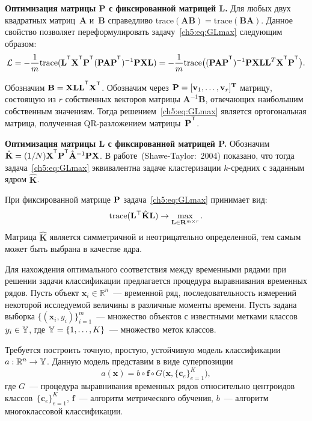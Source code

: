 \documentclass[11pt, a5paper]{dissert}
\begin{document}
\textbf{Оптимизация матрицы P с фиксированной матрицей L.}
Для любых двух квадратных матриц~$\mathbf{A}$ и~$\mathbf{B}$ справедливо $\text{trace}(\mathbf{AB}) = \text{trace}(\mathbf{BA})$.
Данное свойство позволяет переформулировать задачу~\eqref{ch5:eq:GLmax} следующим образом:
\[
	\cL = -\frac{1}{m} \text{trace} (\mathbf{L}^{\T} \bX^{\T} \bP^{\T} (\bP \mathbf{A} \bP^{\T})^{-1} \bP \bX \mathbf{L}) = -\frac{1}{m} \text{trace} \bigl((\bP \mathbf{A} \bP^{\T})^{-1} \bP \bX \mathbf{LL}^{T} \bX^{\T} \bP^{\T}\bigr).
\]
\begin{statement}
	Обозначим $\mathbf{B} = \bX \mathbf{LL}^{\T} \bX^{\T}$.
	Обозначим через $\mathbf{P} = [\mathbf{v}_1, \ldots, \mathbf{v}_r]^{\mathbf{T}}$ матрицу, состоящую из $r$ собственных векторов матрицы $\mathbf{A}^{-1}\mathbf{B}$, отвечающих наибольшим собственным значениям.
	Тогда решением~\eqref{ch5:eq:GLmax} является ортогональная матрица, полученная QR-разложением матрицы~$\bP^{\T}$.
\end{statement}

\textbf{Оптимизация матрицы L с фиксированной матрицей P.}
Обозначим $\hat{\mathbf{K}} = (1/N)\bX^{\T} \bP^{\T} \hat{\mathbf{A}}^{-1} \bP \bX$.
В работе~(Shawe-Taylor:~2004) показано, что тогда задача~\eqref{ch5:eq:GLmax} эквивалентна задаче кластеризации $k$-средних с заданным ядром $\hat{\mathbf{K}}$.

При фиксированной матрице $\mathbf{P}$ задача~\eqref{ch5:eq:GLmax} принимает вид:
\begin{equation*}
	\text{trace} (\mathbf{L}^{\top} \hat{\mathbf{K}} \mathbf{L}) \to \max_{\mathbf{L} \in \mathbf{R}^{m \times r}}.
\end{equation*}
Матрица $\hat{\mathbf{K}}$ является симметричной и неотрицательно определенной, тем самым может быть выбрана в качестве ядра.

Для нахождения оптимального соответствия между временными рядами при решении задачи классификации предлагается процедура выравнивания временных рядов.
Пусть объект $\mathbf{x}_i \in \mathbb{R}^n$~--- временной ряд, последовательность измерений некоторой исследуемой величины в различные моменты времени.
Пусть задана выборка $\{(\mathbf{x}_i, y_i)\}_{i=1}^m$~--- множество объектов с известными метками классов $y_i \in \mathbb{Y}$, где $\mathbb{Y} = \{1, \dots, K\}$~--- множество меток классов.

Требуется построить точную, простую, устойчивую модель классификации $a: \mathbb{R}^n \to \mathbb{Y}$.
Данную модель представим в виде суперпозиции
\begin{equation*}
	a(\mathbf{x}) = b \circ \mathbf{f} \circ G\bigl(\mathbf{x}, \{\mathbf{c}_e\}_{e = 1} ^ K\bigr),
\end{equation*}
где $G$~--- процедура выравнивания временных рядов относительно центроидов классов~$\{\mathbf{c}_e\}_{e = 1} ^ K$, $\mathbf{f}$~--- алгоритм метрического обучения, $b$~--- алгоритм многоклассовой классификации.
\end{document}
